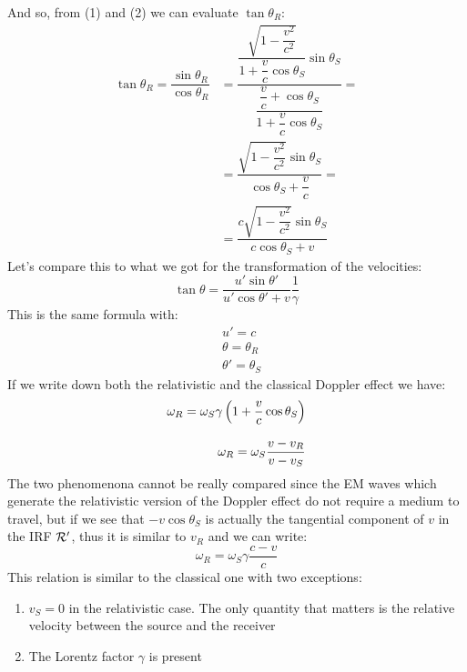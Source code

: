 And so, from (1) and (2) we can evaluate $\tan \theta_R$:
\begin{equation}
  \begin{split}
    \tan \theta_R = \dfrac{\sin \theta_R}{\cos \theta_R} &= \dfrac{\dfrac{\sqrt{1-\dfrac{v^2}{c^2}}}{1 + \dfrac{v}{c}\cos \theta_S}\sin \theta_S}{\dfrac{\dfrac{v}{c} + \cos \theta_S}{1 + \dfrac{v}{c}\cos \theta_S}} = \\[8pt]
    &= \dfrac{\sqrt{1-\dfrac{v^2}{c^2}}\sin \theta_S}{\cos \theta_S + \dfrac{v}{c}} = \\[8pt]
    &= \dfrac{c\sqrt{1-\dfrac{v^2}{c^2}}\sin \theta_S}{c\cos \theta_S + v}
  \end{split}
\end{equation}
Let's compare this to what we got for the transformation of the velocities:
\begin{equation}
  \tan \theta = \dfrac{u'\sin \theta'}{u'\cos \theta' + v}\dfrac{1}{\gamma}
\end{equation}
This is the same formula with:
\begin{equation}
  \begin{split}
    &u' = c \\[8pt]
    &\theta = \theta_R \\[8pt]
    &\theta' = \theta_S
  \end{split}
\end{equation}
If we write down both the relativistic and the classical Doppler effect we have:
\begin{equation}
  \begin{split}
    \omega_R  = \omega_S \gamma\left(1 + \dfrac{v}{c}\cos \theta_S\right) \\[8pt]
    \omega_R = \omega_S \dfrac{v - v_R}{v - v_S}
  \end{split}
\end{equation}
The two phenomenona cannot be really compared since the EM waves which generate the relativistic version of the Doppler effect do not require a medium to travel, but if we see that $-v \cos \theta_S$ is actually the tangential component of $v$ in the IRF $\mathcal{R}'$, thus it is similar to $v_R$ and we can write:
\begin{equation}
  \omega_R  = \omega_S \gamma\dfrac{c - v}{c}
\end{equation}
This relation is similar to the classical one with two exceptions:
\begin{enumerate}
  \item $v_S = 0$ in the relativistic case. The only quantity that matters is the relative velocity between the source and the receiver
  \item The Lorentz factor $\gamma$ is present
\end{enumerate}
